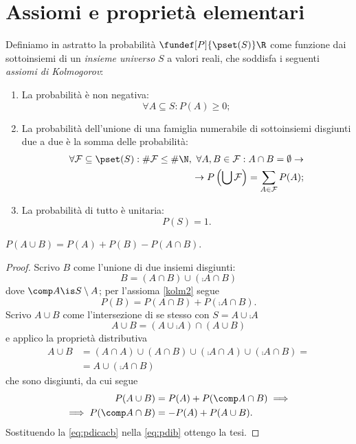 
\section{Assiomi e proprietà elementari}

\begin{definition}[Probabilità]
	Definiamo in astratto la probabilità $\fundef[P]{\pset(S)}\R$ come funzione dai sottoinsiemi di un \emph{insieme universo} $S$ a valori reali, che soddisfa i seguenti \emph{assiomi di Kolmogorov}:
	\begin{enumerate}
		\item La probabilità è non negativa:
		\[\forall A\subseteq S:P(A) \ge 0;\]
		\item La probabilità dell'unione di una famiglia numerabile di sottoinsiemi disgiunti due a due
		è la somma delle probabilità:
		\begin{align*}
			\forall \mathcal F\subseteq \pset(S):
			\#\mathcal F\le \#\N,\ 
			\forall A,B\in\mathcal F: A\cap B=\emptyset \rightarrow \\
			\rightarrow P\left(\bigcup\mathcal F\right)=\sum_{A\in\mathcal F}P(A);
		\end{align*}\label{kolm2}
		\item La probabilità di tutto è unitaria:
		\[P(S)=1.\]
	\end{enumerate}
\end{definition}

\begin{theorem}
	$P(A\cup B) = P(A) + P(B) - P(A\cap B)$.
\end{theorem}

\begin{proof}
	Scrivo $B$ come l'unione di due insiemi disgiunti:
	\[B = (A\cap B) \cup (\comp A \cap B)\]
	dove $\comp A\is S\setminus A$; per l'assioma \ref{kolm2} segue
	\begin{equation}
		\label{eq:pdib}
		P(B) = P(A\cap B) + P(\comp A \cap B).
	\end{equation}
	Scrivo $A\cup B$ come l'intersezione di se stesso con $S=A\cup\comp A$
	\[A\cup B = (A\cup\comp A) \cap (A\cup B)\]
	e applico la proprietà distributiva
	\begin{align*}
		A\cup B
		&= (A\cap A) \cup (A\cap B) \cup (\comp A\cap A) \cup (\comp A \cap B) = \\
		&= A \cup (\comp A\cap B)
	\end{align*}
	che sono disgiunti, da cui segue
	\begin{align}
		P(A\cup B)
		&= P(A) + P(\comp A\cap B) \implies \notag \\
		\implies P(\comp A\cap B)
		&= -P(A) + P(A\cup B). \label{eq:pdicacb}
	\end{align}
	Sostituendo la \eqref{eq:pdicacb} nella \eqref{eq:pdib} ottengo la tesi.
\end{proof}

